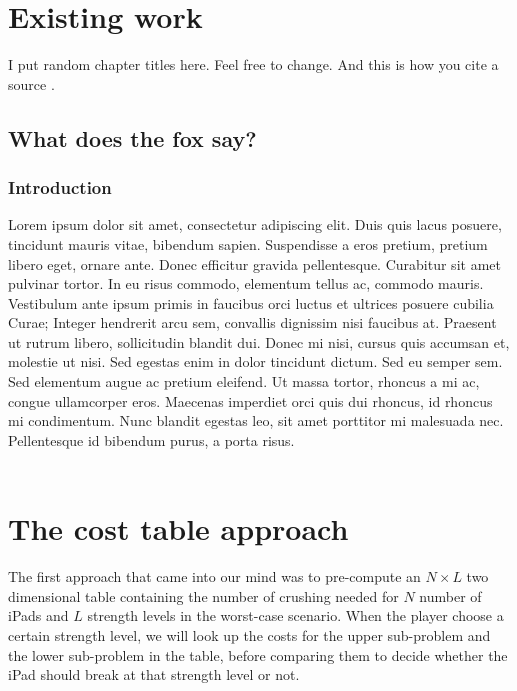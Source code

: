 \documentclass[12pt,a4paper,oneside]{report}
\begin{document}

\chapter{Existing work}
I put random chapter titles here. Feel free to change. And this is how you cite a source \cite{randomblogpost}.

\section{What does the fox say?}
\subsection{Introduction}
Lorem ipsum dolor sit amet, consectetur adipiscing elit. Duis quis lacus posuere, tincidunt mauris vitae, bibendum sapien. Suspendisse a eros pretium, pretium libero eget, ornare ante. Donec efficitur gravida pellentesque. Curabitur sit amet pulvinar tortor. In eu risus commodo, elementum tellus ac, commodo mauris. Vestibulum ante ipsum primis in faucibus orci luctus et ultrices posuere cubilia Curae; Integer hendrerit arcu sem, convallis dignissim nisi faucibus at. Praesent ut rutrum libero, sollicitudin blandit dui. Donec mi nisi, cursus quis accumsan et, molestie ut nisi. Sed egestas enim in dolor tincidunt dictum. Sed eu semper sem. Sed elementum augue ac pretium eleifend. Ut massa tortor, rhoncus a mi ac, congue ullamcorper eros. Maecenas imperdiet orci quis dui rhoncus, id rhoncus mi condimentum. Nunc blandit egestas leo, sit amet porttitor mi malesuada nec. Pellentesque id bibendum purus, a porta risus. \\\\


\chapter{The cost table approach}
The first approach that came into our mind was to pre-compute an $N \times L$ two dimensional table containing the number of crushing needed for $N$ number of iPads and $L$ strength levels in the worst-case scenario. When the player choose a certain strength level, we will look up the costs for the upper sub-problem and the lower sub-problem in the table, before comparing them to decide whether the iPad should break at that strength level or not.
\end{document}
